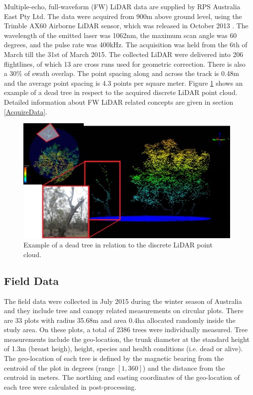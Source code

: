 \documentclass{subfiles}
\begin{document}
\par Multiple-echo, full-waveform (FW) LiDAR data are supplied by RPS Australia East Pty Ltd. The data were acquired from 900m above ground level, using the Trimble AX60 Airborne LiDAR sensor, which was released in October 2013 \cite{Trimble}. The wavelength of the emitted laser was 1062nm, the maximum scan angle was 60 degrees, and the pulse rate was 400kHz. The acquisition was held from the 6th of March till the 31st of March 2015.  The collected LiDAR were delivered into 206 flightlines, of which 13 are cross runs used for geometric correction. There is also a 30\% of swath overlap. The point spacing along and across the track  is 0.48m and the average point spacing is 4.3 points per square meter. Figure \ref{fig:DeadTreeInLiDAR} shows an example of a dead tree in respect to the acquired discrete LiDAR point cloud.   Detailed information about FW LiDAR related concepts are given in section \ref{AcquireData}.



\begin{figure} [h!]
	\centering
	\includegraphics[width=\textwidth]{img/dead/DeadTreeInLiDAR}
	\caption{Example of a dead tree in relation to the discrete LiDAR point cloud.}
	\label{fig:DeadTreeInLiDAR}
\end{figure}



\subsection{Field Data}\label{sec:fieldData}

\par The field data were collected in July 2015 during the winter season of Australia and they include tree and canopy related measurements on circular plots. There are 33 plots with radius 35.68m and area 0.4ha  allocated randomly inside the study area. On these plots, a total of 2386 trees were individually measured.  Tree measurements include the geo-location, the trunk diameter at the standard height of 1.3m (breast heigh), height, species and health conditions (i.e. dead or alive). The geo-location of each tree is defined by the magnetic bearing from the centroid of the plot in degrees (range $[1,360]$) and the distance from the centroid in meters. The northing and easting coordinates of the geo-location of each tree were calculated in post-processing. 
\end{document}
